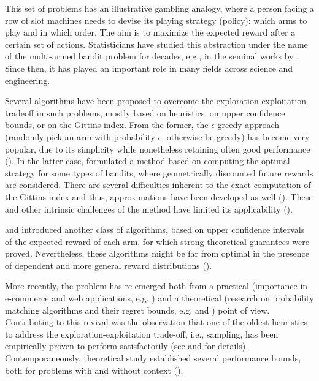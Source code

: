 \documentclass[10pt]{article}
\newcommand{\ie}{i.e., }
\newcommand{\eg}{e.g. }
\begin{document}
This set of problems has an illustrative gambling analogy, where a person facing a row of slot machines needs to devise its playing strategy (policy): which arms to play and in which order. The aim is to maximize the expected reward after a certain set of actions. Statisticians have studied this abstraction under the name of the multi-armed bandit problem for decades, e.g., in the seminal works by \cite{j-Robbins1952,j-Robbins1956}. Since then, it has played an important role in many fields across science and engineering.

Several algorithms have been proposed to overcome the exploration-exploitation tradeoff in such problems, mostly based on heuristics, on upper confidence bounds, or on the Gittins index. From the former, the $\epsilon$-greedy approach (randomly pick an arm with probability $\epsilon$, otherwise be greedy) has become very popular, due to its simplicity 
while nonetheless retaining often good performance (\cite{j-Auer2002}). In the latter case, \cite{j-Gittins1979} formulated a method based on computing the optimal strategy for some types of bandits, where geometrically discounted future rewards are considered. There are several difficulties inherent to the exact computation of the Gittins index and thus, approximations have been developed as well (\cite{j-Brezzi2002}). These and other intrinsic challenges of the method have limited its applicability (\cite{b-Sutton1998}).

\cite{j-Lai1985} and \cite{j-Lai1987} introduced another class of algorithms, based on upper confidence intervals of the expected reward of each arm, for which strong theoretical guarantees were proved. Nevertheless, these algorithms might be far from optimal in the presence of dependent and more general reward distributions (\cite{j-Scott2010}).

More recently, the problem has re-emerged both from a practical (importance in e-commerce and web applications, \eg \cite{j-Li2010}) and a theoretical (research on probability matching algorithms and their regret bounds, \eg \cite{j-Agrawal2011} and \cite{ip-Maillard2011}) point of view. Contributing to this revival was the observation that
one of the oldest heuristics to address the exploration-exploitation trade-off, \ie \cite{j-Thompson1935,j-Thompson1933} sampling, has been empirically proven to perform satisfactorily (see \cite{ic-Chapelle2011} and \cite{j-Scott2015} for details). Contemporaneously, theoretical study established several performance bounds, both for problems with and without context (\cite{j-Agrawal2012,j-Agrawal2012a,ic-Korda2013,j-Russo2014,j-Russo2016}).
\end{document}
